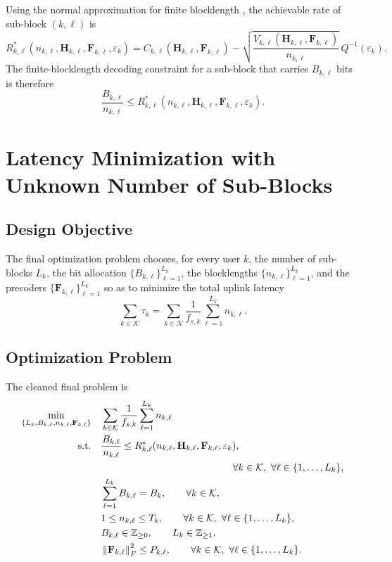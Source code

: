 \documentclass[11pt]{article}
\newcommand{\Kset}{\mathcal{K}}
\newcommand{\F}{\mathbf{F}}
\newcommand{\Hc}{\mathbf{H}}
\newcommand{\norm}[1]{\left\lVert #1 \right\rVert}
\begin{document}
Using the normal approximation for finite blocklength \cite{polyanskiy2010}, the achievable rate of sub-block $(k,\ell)$ is
\begin{equation}
R_{k,\ell}^*(n_{k,\ell},\Hc_{k,\ell},\F_{k,\ell},\varepsilon_k)
=
C_{k,\ell}(\Hc_{k,\ell},\F_{k,\ell})
-
\sqrt{\frac{V_{k,\ell}(\Hc_{k,\ell},\F_{k,\ell})}{n_{k,\ell}}}\,
Q^{-1}(\varepsilon_k).
\label{eq:fbl-rate}
\end{equation}
The finite-blocklength decoding constraint for a sub-block that carries $B_{k,\ell}$ bits is therefore
\begin{equation}
\frac{B_{k,\ell}}{n_{k,\ell}}
\le
R_{k,\ell}^*(n_{k,\ell},\Hc_{k,\ell},\F_{k,\ell},\varepsilon_k).
\label{eq:fbl-feasibility}
\end{equation}

\section{Latency Minimization with Unknown Number of Sub-Blocks}
\subsection{Design Objective}
The final optimization problem chooses, for every user $k$, the number of sub-blocks $L_k$, the bit allocation $\{B_{k,\ell}\}_{\ell=1}^{L_k}$, the blocklengths $\{n_{k,\ell}\}_{\ell=1}^{L_k}$, and the precoders $\{\F_{k,\ell}\}_{\ell=1}^{L_k}$ so as to minimize the total uplink latency
\begin{equation}
\sum_{k \in \Kset}\tau_k
=
\sum_{k \in \Kset}\frac{1}{f_{s,k}}\sum_{\ell=1}^{L_k} n_{k,\ell}.
\label{eq:total-latency}
\end{equation}

\subsection{Optimization Problem}
The cleaned final problem is
\begin{subequations}
\begin{align}
\min_{\{L_k,B_{k,\ell},n_{k,\ell},\F_{k,\ell}\}}
\quad
&
\sum_{k \in \Kset}\frac{1}{f_{s,k}}\sum_{\ell=1}^{L_k} n_{k,\ell}
\label{prob:main-obj}
\\
\text{s.t.}\quad
&
\frac{B_{k,\ell}}{n_{k,\ell}}
\le
R_{k,\ell}^*(n_{k,\ell},\Hc_{k,\ell},\F_{k,\ell},\varepsilon_k),
\nonumber\\
&\hspace{4.7cm}
\forall k \in \Kset,\ \forall \ell \in \{1,\dots,L_k\},
\label{prob:fbl}
\\
&
\sum_{\ell=1}^{L_k} B_{k,\ell} = B_k,
\qquad
\forall k \in \Kset,
\label{prob:payload}
\\
&
1 \le n_{k,\ell} \le T_k,
\qquad
\forall k \in \Kset,\ \forall \ell \in \{1,\dots,L_k\},
\label{prob:blocklength}
\\
&
B_{k,\ell} \in \mathbb{Z}_{\ge 0},
\qquad
L_k \in \mathbb{Z}_{\ge 1},
\label{prob:integrality}
\\
&
\norm{\F_{k,\ell}}_F^2 \le P_{k,\ell},
\qquad
\forall k \in \Kset,\ \forall \ell \in \{1,\dots,L_k\}.
\label{prob:power}
\end{align}
\end{subequations}
\end{document}
